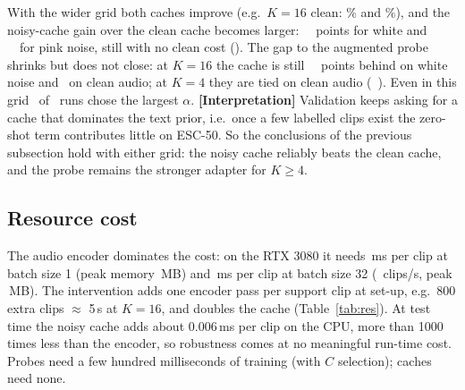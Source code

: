 \begin{table}[H]
\centering\small
\caption{\textbf{[Measured]} same as Table~\ref{tab:main} with the extended grid ($\alpha\le128$, $\beta\ge0.25$). Zero-shot and probe rows are unchanged by construction.}
\label{tab:ext}

\end{table}

With the wider grid both caches improve (e.g.\ $K{=}16$ clean: \exttipcleanKsixteenclean\% and \exttipaugKsixteenclean\%), and the noisy-cache gain over the clean cache becomes larger:
\extdtipaugvstipcleanKsixteenwhite\ \extcitipaugvstipcleanKsixteenwhite\ points for white and \extdtipaugvstipcleanKsixteenpink\ \extcitipaugvstipcleanKsixteenpink\ for pink noise, still with no clean cost (\extdtipaugvstipcleanKsixteenclean).
The gap to the augmented probe shrinks but does not close: at $K{=}16$ the cache is still \extdtipaugvslpaugKsixteenwhite\ \extcitipaugvslpaugKsixteenwhite\ points behind on white noise and \extdtipaugvslpaugKsixteenclean\ on clean audio;
at $K{=}4$ they are tied on clean audio (\extdtipaugvslpaugKfourclean\ \extcitipaugvslpaugKfourclean). Even in this grid \extalphaedge\ of \extalphaN\ runs chose the largest $\alpha$.
\textbf{[Interpretation]} Validation keeps asking for a cache that dominates the text prior, i.e.\ once a few labelled clips exist the zero-shot term contributes little on ESC-50. So the conclusions of the previous subsection hold with either grid: the noisy cache reliably beats the clean cache, and the probe remains the stronger adapter for $K\ge4$.

\subsection{Resource cost}

The audio encoder dominates the cost: on the RTX 3080 it needs \enclatencybsonemsmedian\,ms per clip at batch size 1 (peak memory \encpeakmembsoneMB\,MB)
and \encperclipmsbatched\,ms per clip at batch size 32 (\encthroughputclipspers\ clips/s, peak \encpeakmembsthreetwoMB\,MB).
The intervention adds one encoder pass per support clip at set-up, e.g.\ 800 extra clips $\approx$ 5\,s at $K{=}16$, and doubles the cache (Table~\ref{tab:res}).
At test time the noisy cache adds about 0.006\,ms per clip on the CPU, more than 1000 times less than the encoder, so robustness comes at no meaningful run-time cost.
Probes need a few hundred milliseconds of training (with $C$ selection); caches need none.

